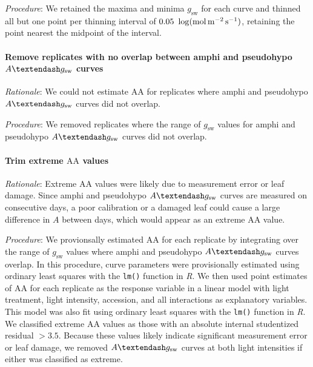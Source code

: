 \documentclass[
  letterpaper,
  DIV=11,
  numbers=noendperiod]{scrartcl}
\let\oldparagraph\paragraph
\renewcommand{\paragraph}[1]{\oldparagraph{#1}\mbox{}}
\newcommand{\aax}{$\mathrm{AA}$}
\newcommand{\agcurve}{$A \textendash g_\text{sw}$}
\newcommand{\gsw}{$g_\text{sw}$}
\begin{document}
\emph{Procedure}: We retained the maxima and minima \gsw{} for each
curve and thinned all but one point per thinning interval of
\(0.05~\log(\si{\mol\raiseto{-2}\meter\raiseto{-1}\second})\), retaining
the point nearest the midpoint of the interval.

\paragraph{\texorpdfstring{Remove replicates with no overlap between
amphi and pseudohypo \agcurve{}
curves}{Remove replicates with no overlap between amphi and pseudohypo  curves}}\label{remove-replicates-with-no-overlap-between-amphi-and-pseudohypo-curves}

\emph{Rationale}: We could not estimate \aax{} for replicates where
amphi and pseudohypo \agcurve{} curves did not overlap.

\emph{Procedure}: We removed replicates where the range of \gsw{} values
for amphi and pseudohypo \agcurve{} curves did not overlap.

\paragraph{\texorpdfstring{Trim extreme \aax{}
values}{Trim extreme  values}}\label{trim-extreme-values}

\emph{Rationale}: Extreme \aax{} values were likely due to measurement
error or leaf damage. Since amphi and pseudohypo \agcurve{} curves are
measured on consecutive days, a poor calibration or a damaged leaf could
cause a large difference in \(A\) between days, which would appear as an
extreme \aax{} value.

\emph{Procedure}: We provionsally estimated \aax{} for each replicate by
integrating over the range of \gsw{} values where amphi and pseudohypo
\agcurve{} curves overlap. In this procedure, curve parameters were
provisionally estimated using ordinary least squares with the
\texttt{lm()} function in \emph{R}. We then used point estimates of
\aax{} for each replicate as the response variable in a linear model
with light treatment, light intensity, accession, and all interactions
as explanatory variables. This model was also fit using ordinary least
squares with the \texttt{lm()} function in \emph{R}. We classified
extreme \aax{} values as those with an absolute internal studentized
residual \(> 3.5\). Because these values likely indicate significant
measurement error or leaf damage, we removed \agcurve{} curves at both
light intensities if either was classified as extreme.
\end{document}
